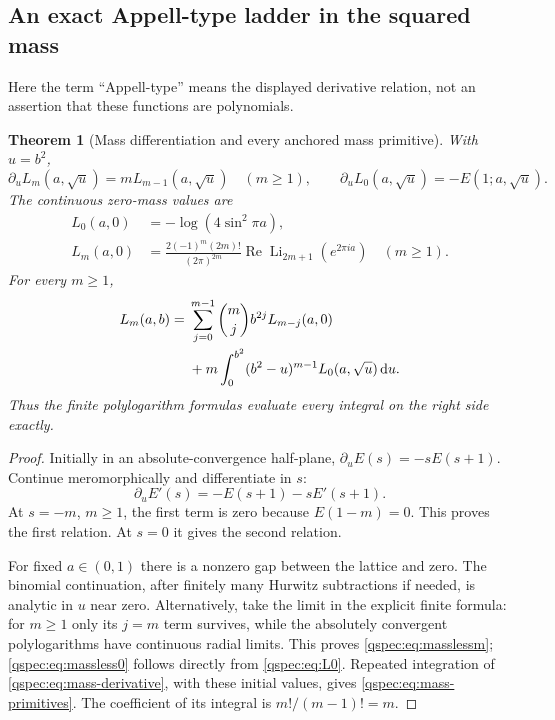 \documentclass[11pt,letterpaper]{article}
\numberwithin{equation}{section}
\newtheorem{theorem}{Theorem}[section]
\theoremstyle{definition}
\newcommand{\Li}{\operatorname{Li}}
\newcommand{\Rea}{\operatorname{Re}}
\newcommand{\dd}{\,\mathrm{d}}
\begin{document}
\subsection{An exact Appell-type ladder in the squared mass}
Here the term ``Appell-type'' means the displayed derivative relation,
not an assertion that these functions are polynomials.

\begin{theorem}[Mass differentiation and every anchored mass primitive]
\label{qspec:thm:mass-ladder}
With $u=b^2$,
\begin{equation}\label{qspec:eq:mass-derivative}
\partial_u L_m(a,\sqrt u)=mL_{m-1}(a,\sqrt u)\quad(m\ge1),
\qquad
\partial_u L_0(a,\sqrt u)=-E(1;a,\sqrt u).
\end{equation}
The continuous zero-mass values are
\begin{align}
L_0(a,0)&=-\log(4\sin^2\pi a),\label{qspec:eq:massless0}\\
L_m(a,0)&=\frac{2(-1)^m(2m)!}{(2\pi)^{2m}}
\Rea\Li_{2m+1}(e^{2\pi ia})\quad(m\ge1).
\label{qspec:eq:masslessm}
\end{align}
For every $m\ge1$,
\begin{align}
L_m(a,b)={}&\sum_{j=0}^{m-1}\binom mj b^{2j}L_{m-j}(a,0)\notag\\
&+m\int_0^{b^2}(b^2-u)^{m-1}L_0(a,\sqrt u)\dd u.
\label{qspec:eq:mass-primitives}
\end{align}
Thus the finite polylogarithm formulas evaluate every integral on the
right side exactly.
\end{theorem}
\begin{proof}
Initially in an absolute-convergence half-plane,
$\partial_u E(s)=-sE(s+1)$. Continue meromorphically and differentiate
in $s$:
\[
\partial_u E'(s)=-E(s+1)-sE'(s+1).
\]
At $s=-m$, $m\ge1$, the first term is zero because
$E(1-m)=0$. This proves the first relation. At $s=0$ it gives the
second relation.

For fixed $a\in(0,1)$ there is a nonzero gap between the lattice and
zero. The binomial continuation, after finitely many Hurwitz
subtractions if needed, is analytic in $u$ near zero. Alternatively,
take the limit in the explicit finite formula: for $m\ge1$ only its
$j=m$ term survives, while the absolutely convergent polylogarithms
have continuous radial limits. This proves
\eqref{qspec:eq:masslessm}; \eqref{qspec:eq:massless0} follows directly
from \eqref{qspec:eq:L0}. Repeated integration of
\eqref{qspec:eq:mass-derivative}, with these initial values, gives
\eqref{qspec:eq:mass-primitives}. The coefficient of its integral is
$m!/(m-1)!=m$.
\end{proof}
\end{document}
